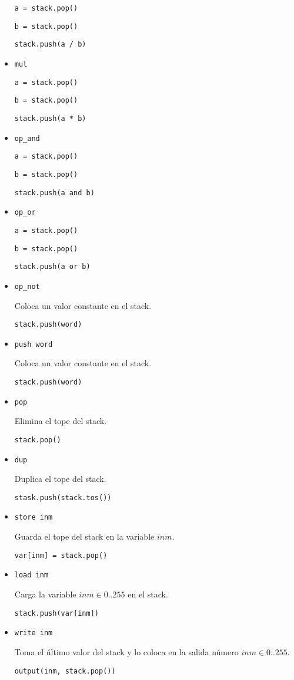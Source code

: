 \begin{itemize}
  \texttt{a = stack.pop()}

  \texttt{b = stack.pop()}

  \texttt{stack.push(a / b)}

\item \texttt{mul}

  \texttt{a = stack.pop()}

  \texttt{b = stack.pop()}

  \texttt{stack.push(a * b)}

\item \texttt{op\_and}

  \texttt{a = stack.pop()}

  \texttt{b = stack.pop()}

  \texttt{stack.push(a and b)}

\item \texttt{op\_or}

  \texttt{a = stack.pop()}

  \texttt{b = stack.pop()}

  \texttt{stack.push(a or b)}

\item \texttt{op\_not}

  Coloca un valor constante en el stack.

  \texttt{stack.push(word)}

\item \texttt{push word}

  Coloca un valor constante en el stack.

  \texttt{stack.push(word)}

\item \texttt{pop}

  Elimina el tope del stack.

  \texttt{stack.pop()}

\item \texttt{dup}

  Duplica el tope del stack.

  \texttt{stask.push(stack.tos())}

\item \texttt{store inm}

  Guarda el tope del stack en la variable $inm$.

  \texttt{var[inm] = stack.pop()}

\item \texttt{load inm}

  Carga la variable $inm \in {0..255}$ en el stack.

  \texttt{stack.push(var[inm])}

\item \texttt{write inm}

  Toma el último valor del stack y lo coloca en la 
  salida número $inm \in {0..255}$.

  \texttt{output(inm, stack.pop())}

\end{itemize}


